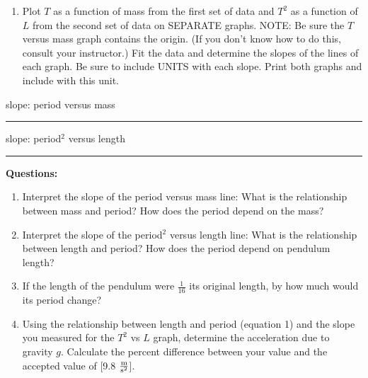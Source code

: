 \begin{enumerate}
\item Plot $T$ as a function of mass from the first set of data and $T^2$ as a function of $L$ from the second set of data on SEPARATE graphs. NOTE: Be sure the $T$ versus mass graph contains the origin. (If you don't know how to do this, consult your instructor.) Fit the data and determine the slopes of the lines of each graph. Be sure to include UNITS with each slope. Print both graphs and include with this unit.

\end{enumerate}

\vspace{10pt}

slope: period versus mass \rule{1.5in}{0.2pt}

\vspace{10pt}

slope: period$^2$ versus length \rule{1.5in}{0.2pt}

\vspace{10pt}

{\noindent \bf Questions:}

\begin{enumerate}
\item Interpret the slope of the period versus mass line: What is the relationship
between mass and period? How does the period depend on the mass? \vspace{20mm}

\item Interpret the slope of the period$^2$ versus length line: What is the relationship
between length and period? How does the period depend on pendulum length? \vspace{20mm}

\item If the length of the pendulum were $\frac{1}{16}$ its original length, by how
much would its period change? \vspace{20mm}

\item Using the relationship between length and period (equation 1) and the slope you measured for the $T^2$ vs $L$ graph, determine the acceleration due to gravity $g$.  Calculate the percent difference between your value and the accepted value of [9.8 $\frac{\rm m}{\rm s^2}$].
\end{enumerate}
